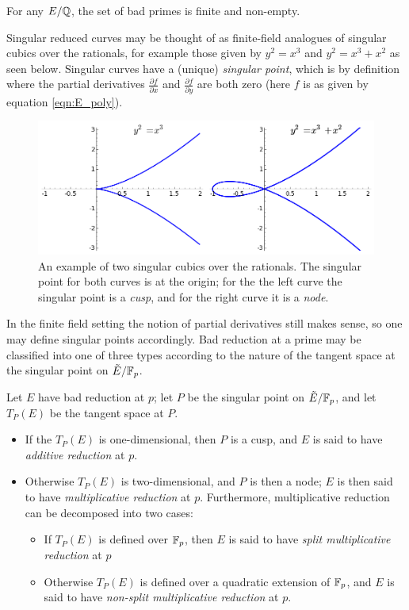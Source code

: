 \begin{theorem}
For any $E/\mathbb{Q}$, the set of bad primes is finite and non-empty.
\end{theorem}

Singular reduced curves may be thought of as finite-field analogues of singular cubics over the rationals, for example those given by $y^2 = x^3$ and $y^2 = x^3+x^2$ as seen below. Singular curves have a (unique) {\it singular point}, which is by definition where the partial derivatives $\frac{\partial f}{\partial x}$ and $\frac{\partial f}{\partial y}$ are both zero (here $f$ is as given by equation \ref{eqn:E_poly}).

\begin{figure}[!h]
    \centering
    \includegraphics[width=1.0\textwidth]{graphics/singular_cubics.png}
    \caption{An example of two singular cubics over the rationals. The singular point for both curves is at the origin; for the the left curve the singular point is a {\it cusp}, and for the right curve it is a {\it node}.}
    \label{fig:singular_cubics}
\end{figure}

In the finite field setting the notion of partial derivatives still makes sense, so one may define singular points accordingly. Bad reduction at a prime may be classified into one of three types according to the nature of the tangent space at the singular point on $\tilde{E}/\mathbb{F}_p$.
\begin{definition}
Let $E$ have bad reduction at $p$; let $P$ be the singular point on $\tilde{E}/\mathbb{F}_p$, and let $T_P(E)$ be the tangent space at $P$.
\begin{itemize}
\item If the $T_P(E)$ is one-dimensional, then $P$ is a cusp, and $E$ is said to have {\it additive reduction} at $p$.
\item Otherwise $T_P(E)$ is two-dimensional, and $P$ is then a node; $E$ is then said to have {\it multiplicative reduction} at $p$. Furthermore, multiplicative reduction can be decomposed into two cases:
\begin{itemize}
\item If $T_P(E)$ is defined over $\mathbb{F}_p$, then $E$ is said to have {\it split multiplicative reduction} at $p$
\item Otherwise $T_P(E)$ is defined over a quadratic extension of $\mathbb{F}_p$, and $E$ is said to have {\it non-split multiplicative reduction} at $p$.
\end{itemize}
\end{itemize}
\end{definition}

